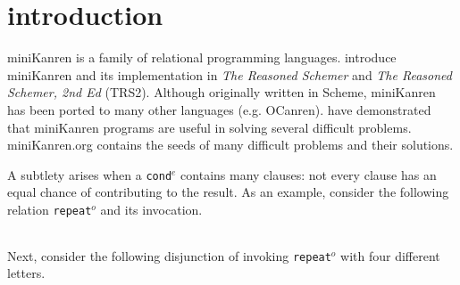 \documentclass[format=acmlarge, review=true, authordraft=true]{acmart}
\newcommand{\conde}{\texttt{cond$^e$}}
\newcommand{\conj}{\texttt{conj}}
\newcommand{\disj}{\texttt{disj}}
\newcommand{\clisting}[1]{
\begin{center}
  \begin{tabular}{c}
	
    \end{tabular}
\end{center}
}
\newcommand{\repeato}{\texttt{repeat$^o$}}
\newcommand{\DFSi }[0]{DFS$_{i}$}
\begin{document}
\begin{abstract}
% 

\end{abstract}

\maketitle

\section{introduction}

miniKanren is a family of relational programming languages.
\citet{Friedman:2005:RS:1121583,friedman_reasoned_2018} introduce
miniKanren and its implementation in \emph{The Reasoned Schemer} 
and \emph{The Reasoned Schemer, 2nd Ed} (TRS2). Although originally written in 
Scheme, miniKanren has been ported to many other languages (e.g. 
OCanren\citep{kosarev2018typed}). \citet{byrd2017unified} have 
demonstrated that miniKanren programs are useful in solving several difficult
problems. miniKanren.org contains the seeds of many difficult problems and 
their solutions. 


A subtlety arises 
when a \conde{} contains many clauses: not every clause has an 
equal chance of contributing to the result. As an example, consider the following 
relation \repeato{} and its invocation. 

\clisting{Figures/repeato.rkt}

\noindent Next, consider the following disjunction of invoking \repeato{} with four 
different letters.
\end{document}
